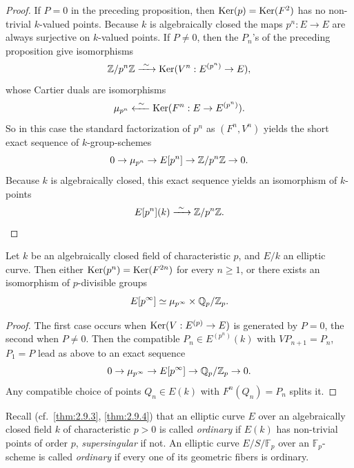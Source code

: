 \begin{proof}
If $P = 0$ in the preceding proposition, then $\operatorname{Ker}(p) = \operatorname{Ker}(F^2)$ has no non-trivial $k$-valued points. Because $k$ is algebraically closed the maps $p^n : E \to E$ are always surjective on $k$-valued points. If $P \ne 0$, then the $P_n$'s of the preceding proposition give isomorphisms
\[
\mathbb{Z}/p^n\mathbb{Z} \xrightarrow{\ \sim\ } \operatorname{Ker}(V^n : E^{(p^n)} \to E) ,
\]
whose Cartier duals are isomorphisms
\[
\mu_{p^n} \xleftarrow{\ \sim\ } \operatorname{Ker}(F^n : E \to E^{(p^n)}) .
\]
So in this case the standard factorization of $p^n$ as $(F^n, V^n)$ yields the short exact sequence of $k$-group-schemes
\[
0 \to \mu_{p^n} \to E[p^n] \to \mathbb{Z}/p^n\mathbb{Z} \to 0 .
\]
Because $k$ is algebraically closed, this exact sequence yields an isomorphism of $k$-points
\[
E[p^n](k) \xrightarrow{\ \sim\ } \mathbb{Z}/p^n\mathbb{Z} . \qedhere
\]
\end{proof}

\begin{kcor}\label{cor:12.3.5}
Let $k$ be an algebraically closed field of characteristic $p$, and $E/k$ an elliptic curve. Then either $\operatorname{Ker}(p^n) = \operatorname{Ker}(F^{2n})$ for every $n \ge 1$, or there exists an isomorphism of $p$-divisible groups
\[
E[p^\infty] \simeq \mu_{p^\infty} \times \mathbb{Q}_p/\mathbb{Z}_p .
\]
\end{kcor}

\begin{proof}
The first case occurs when $\operatorname{Ker}(V : E^{(p)} \to E)$ is generated by $P = 0$, the second when $P \ne 0$. Then the compatible $P_n \in E^{(p^n)}(k)$ with $V P_{n+1} = P_n$, $P_1 = P$ lead as above to an exact sequence
\[
0 \to \mu_{p^\infty} \to E[p^\infty] \to \mathbb{Q}_p/\mathbb{Z}_p \to 0 .
\]
Any compatible choice of points $Q_n \in E(k)$ with $F^n(Q_n) = P_n$ splits it.
\end{proof}

\par\smallskip
Recall (cf.~\ref{thm:2.9.3}, \ref{thm:2.9.4}) that an elliptic curve $E$ over an algebraically closed field $k$ of characteristic $p > 0$ is called \emph{ordinary} if $E(k)$ has non-trivial points of order $p$, \emph{supersingular} if not. An elliptic curve $E/S/\mathbb{F}_p$ over an $\mathbb{F}_p$-scheme is called \emph{ordinary} if every one of its geometric fibers is ordinary.

